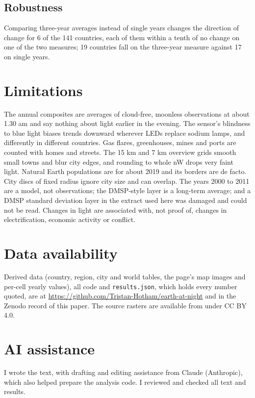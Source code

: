 \documentclass[11pt,a4paper]{article}
\begin{document}
\subsection{Robustness}
Comparing three-year averages instead of single years changes the direction of change for 6 of the 141 countries, each of them within a tenth of no change on one of the two measures; 19 countries fall on the three-year measure against 17 on single years.

\section{Limitations}
The annual composites are averages of cloud-free, moonless observations at about 1.30 am and say nothing about light earlier in the evening. The sensor's blindness to blue light biases trends downward wherever LEDs replace sodium lamps, and differently in different countries. Gas flares, greenhouses, mines and ports are counted with homes and streets. The 15 km and 7 km overview grids smooth small towns and blur city edges, and rounding to whole nW drops very faint light. Natural Earth populations are for about 2019 and its borders are de facto. City discs of fixed radius ignore city size and can overlap. The years 2000 to 2011 are a model, not observations; the DMSP-style layer is a long-term average; and a DMSP standard deviation layer in the extract used here was damaged and could not be read. Changes in light are associated with, not proof of, changes in electrification, economic activity or conflict.

\section*{Data availability}
Derived data (country, region, city and world tables, the page's map images and per-cell yearly values), all code and \texttt{results.json}, which holds every number quoted, are at \url{https://github.com/Tristan-Hotham/earth-at-night} and in the Zenodo record of this paper. The source rasters are available from \citet{hengl} under CC BY 4.0.

\section*{AI assistance}
I wrote the text, with drafting and editing assistance from Claude (Anthropic), which also helped prepare the analysis code. I reviewed and checked all text and results.
\end{document}
